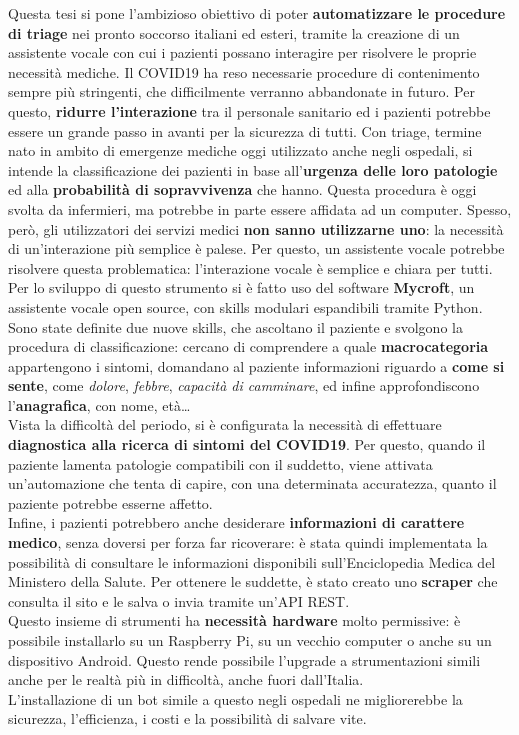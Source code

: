 \documentclass[trieste,corpo=11pt,numerazioneromana]{toptesi}
\begin{document}
\sommario
Questa tesi si pone l'ambizioso obiettivo di poter \textbf{automatizzare le procedure di triage} nei pronto soccorso italiani ed esteri, tramite la creazione di un assistente vocale con cui i pazienti possano interagire per risolvere le proprie necessità mediche. Il COVID19 ha reso necessarie procedure di contenimento sempre più stringenti, che difficilmente verranno abbandonate in futuro. Per questo, \textbf{ridurre l'interazione} tra il personale sanitario ed i pazienti potrebbe essere un grande passo in avanti per la sicurezza di tutti. Con triage, termine nato in ambito di emergenze mediche oggi utilizzato anche negli ospedali, si intende la classificazione dei pazienti in base all'\textbf{urgenza delle loro patologie} ed alla \textbf{probabilità di sopravvivenza} che hanno. Questa procedura è oggi svolta da infermieri, ma potrebbe in parte essere affidata ad un computer. Spesso, però, gli utilizzatori dei servizi medici \textbf{non sanno utilizzarne uno}: la necessità di un'interazione più semplice è palese. Per questo, un assistente vocale potrebbe risolvere questa problematica: l'interazione vocale è semplice e chiara per tutti.\\
Per lo sviluppo di questo strumento si è fatto uso del software \textbf{Mycroft}, un assistente vocale open source, con skills modulari espandibili tramite Python. Sono state definite due nuove skills, che ascoltano il paziente e svolgono la procedura di classificazione: cercano di comprendere a quale \textbf{macrocategoria} appartengono i sintomi, domandano al paziente informazioni riguardo a \textbf{come si sente}, come \textit{dolore}, \textit{febbre}, \textit{capacità di camminare}, ed infine approfondiscono l'\textbf{anagrafica}, con nome, età\dots\\
Vista la difficoltà del periodo, si è configurata la necessità di effettuare \textbf{diagnostica alla ricerca di sintomi del COVID19}. Per questo, quando il paziente lamenta patologie compatibili con il suddetto, viene attivata un'automazione che tenta di capire, con una determinata accuratezza, quanto il paziente potrebbe esserne affetto.\\
Infine, i pazienti potrebbero anche desiderare \textbf{informazioni di carattere medico}, senza doversi per forza far ricoverare: è stata quindi implementata la possibilità di consultare le informazioni disponibili sull'Enciclopedia Medica del Ministero della Salute. Per ottenere le suddette, è stato creato uno \textbf{scraper} che consulta il sito e le salva o invia tramite un'API REST.\\
Questo insieme di strumenti ha \textbf{necessità hardware} molto permissive: è possibile installarlo su un Raspberry Pi, su un vecchio computer o anche su un dispositivo Android. Questo rende possibile l'upgrade a strumentazioni simili anche per le realtà più in difficoltà, anche fuori dall'Italia.\\
L'installazione di un bot simile a questo negli ospedali ne migliorerebbe la sicurezza, l'efficienza, i costi e la possibilità di salvare vite.
\end{document}
